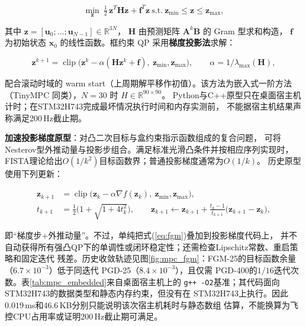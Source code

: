 \begin{equation}
    \min_{\mathbf{z}}\ \tfrac{1}{2}\,\mathbf{z}^T\mathbf{H}\mathbf{z} + \mathbf{f}^T\mathbf{z}
    \ \text{s.t.}\ \mathbf{z}_{\min}\le\mathbf{z}\le\mathbf{z}_{\max},
    \label{eq:mpc_qp}
\end{equation}

其中 $\mathbf{z}=[\mathbf{u}_0;\dots;\mathbf{u}_{N-1}]\in\mathbb{R}^{3N}$，
$\mathbf{H}$ 由预测矩阵 $\mathbf{A}^k\mathbf{B}$ 的 Gram 型求和构造，
$\mathbf{f}$ 为初始状态 $\mathbf{x}_0$ 的线性函数。框约束 QP 采用\textbf{梯度投影法}求解：

\begin{equation}
    \mathbf{z}^{k+1} = \operatorname{clip}\!\big(\mathbf{z}^{k} - \alpha(\mathbf{H}\mathbf{z}^k+\mathbf{f}),\ \mathbf{z}_{\min},\mathbf{z}_{\max}\big),
    \qquad \alpha = 1/\lambda_{\max}(\mathbf{H}),
    \label{eq:pgd}
\end{equation}

配合滚动时域的 warm start（上周期解平移作初值）。该方法为嵌入式一阶方法
（TinyMPC\cite{cassel2024tinympc} 同类），$N=30$ 时 $H\in\mathbb{R}^{90\times90}$。
Python与C++原型只在桌面宿主机计时；在STM32H743完成最坏情况执行时间和内存实测前，
不能据宿主机结果声称满足200\,Hz截止期。

\textbf{加速投影梯度原型}：对凸二次目标与盒约束指示函数组成的复合问题，
可将Nesterov型外推动量与投影步组合。满足标准光滑凸条件并按相应序列实现时，
FISTA理论给出$O(1/k^2)$目标函数界\cite{beck2009fista}；普通投影梯度通常为$O(1/k)$。
历史原型使用下列更新：

\begin{align}
    \mathbf{z}_{k+1} &= \operatorname{clip}\!\big(\mathbf{z}_k - \alpha\nabla f(\mathbf{z}_k),
        \ \mathbf{z}_{\min},\mathbf{z}_{\max}\big),
    \label{eq:fgm_step}\\
    t_{k+1} &= \tfrac{1}{2}\Big(1+\sqrt{1+4t_k^2}\Big),\qquad
    \mathbf{z}_{k+1} \leftarrow \mathbf{z}_{k+1}
        + \frac{t_k-1}{t_{k+1}}\big(\mathbf{z}_{k+1}-\mathbf{z}_k\big),
    \label{eq:fgm}
\end{align}

即“梯度步+外推动量”。不过，单纯把式(\ref{eq:fgm})叠加到投影梯度代码上，
并不自动获得所有强凸QP下的单调性或闭环稳定性；还需检查Lipschitz常数、重启策略和固定迭代
残差。历史收敛轨迹见图\ref{fig:mpc_fgm}：FGM-25的目标函数余量
（$6.7\times10^{-3}$）低于同迭代 PGD-25（$8.4\times10^{-3}$），且仅需
PGD-400的$1/16$迭代次数。表\ref{tab:mpc_embedded}来自桌面宿主机上的
\texttt{g++ -O2}基准；其代码面向STM32H743的数据类型和静态内存约束，但没有在
STM32H743上执行。因此$0.019$\,ms和46.6\,KB分别只能说明该次宿主机耗时与静态数组
估算，不能换算为飞控CPU占用率或证明200\,Hz截止期可满足。

